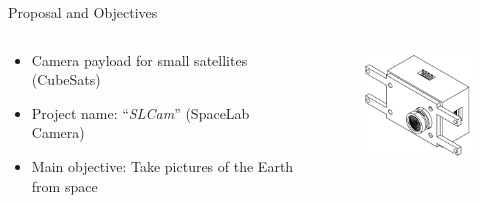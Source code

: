 %
%
%
%
%

%
%
%
%
%

\begin{frame}{Proposal and Objectives}

    \begin{columns}[t]
        \begin{column}[t]{0.6\textwidth}
            \begin{itemize}
                \item Camera payload for small satellites (CubeSats)
                \vspace{0.5cm}
                \item Project name: ``\textit{SLCam}'' (SpaceLab Camera)
                \vspace{0.5cm}
                \item Main objective: Take pictures of the Earth from space
            \end{itemize}
        \end{column}
        \begin{column}[t]{0.4\textwidth}
            \begin{figure}[!ht]
                \begin{center}
                    \includegraphics[width=4cm]{figures/slcam-dw}
                \end{center}
            \end{figure}
        \end{column}
    \end{columns}

\end{frame}